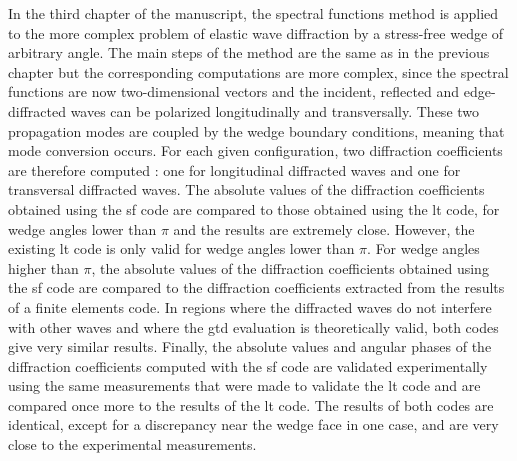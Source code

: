 In the third chapter of the manuscript, the spectral functions method is applied to the more complex problem of elastic wave diffraction by a stress-free wedge of arbitrary angle. The main steps of the method are the same as in the previous chapter but the corresponding computations are more complex, since the spectral functions are now two-dimensional vectors and the incident, reflected and edge-diffracted waves can be polarized longitudinally and transversally. These two propagation modes are coupled by the wedge boundary conditions, meaning that mode conversion occurs. For each given configuration, two diffraction coefficients are therefore computed : one for longitudinal diffracted waves and one for transversal diffracted waves. The absolute values of the diffraction coefficients obtained using the \acrfull{sf} code are compared to those obtained using the \acrshort{lt} code, for wedge angles lower than $\pi$ and the results are extremely close. However, the existing \acrshort{lt} code is only valid for wedge angles lower than $\pi$. For wedge angles higher than $\pi$, the absolute values of the diffraction coefficients obtained using the \acrshort{sf} code are compared to the diffraction coefficients extracted from the results of a finite elements code. In regions where the diffracted waves do not interfere with other waves and where the \acrshort{gtd} evaluation is theoretically valid, both codes give very similar results. Finally, the absolute values and angular phases of the diffraction coefficients computed with the \acrshort{sf} code are validated experimentally using the same measurements that were made to validate the \acrshort{lt} code and are compared once more to the results of the \acrshort{lt} code. The results of both codes are identical, except for a discrepancy near the wedge face in one case, and are very close to the experimental measurements.

